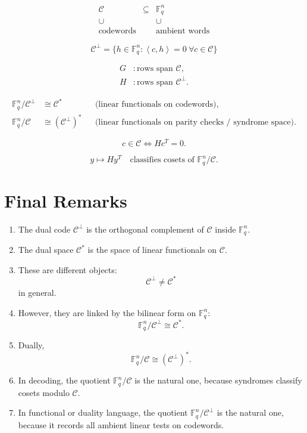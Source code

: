 \documentclass[11pt]{article}
\theoremstyle{remark}
\newcommand{\F}{\mathbb{F}}
\newcommand{\C}{\mathcal{C}}
\newcommand{\Cp}{\mathcal{C}^{\perp}}
\newcommand{\ip}[2]{\left\langle #1,#2\right\rangle}
\begin{document}
	\[
	\begin{array}{ccc}
		\C & \subseteq & \F_q^n \\
		\cup && \cup \\
		\text{codewords} && \text{ambient words}
	\end{array}
	\]
	
	\[
	\Cp
	=
	\{h\in\F_q^n:\ip{c}{h}=0 \ \forall c\in\C\}
	\]
	
	\[
	\begin{aligned}
		G &: \text{rows span } \C,\\[4pt]
		H &: \text{rows span } \Cp.
	\end{aligned}
	\]
	
	\[
	\begin{aligned}
		\F_q^n/\Cp &\cong \C^*
		&& \text{(linear functionals on codewords)},\\[4pt]
		\F_q^n/\C &\cong (\Cp)^*
		&& \text{(linear functionals on parity checks / syndrome space)}.
	\end{aligned}
	\]
	
	\[
	c\in\C \iff Hc^T=0.
	\]
	
	\[
	y\mapsto Hy^T
	\quad\text{classifies cosets of }\F_q^n/\C.
	\]
	
	\section{Final Remarks}
	
	\begin{enumerate}[leftmargin=2em]
		\item The dual code \(\Cp\) is the orthogonal complement of \(\C\) inside \(\F_q^n\).
		\item The dual space \(\C^*\) is the space of linear functionals on \(\C\).
		\item These are different objects:
		\[
		\Cp \neq \C^*
		\]
		in general.
		\item However, they are linked by the bilinear form on \(\F_q^n\):
		\[
		\F_q^n/\Cp \cong \C^*.
		\]
		\item Dually,
		\[
		\F_q^n/\C \cong (\Cp)^*.
		\]
		\item In decoding, the quotient \(\F_q^n/\C\) is the natural one, because syndromes classify cosets modulo \(\C\).
		\item In functional or duality language, the quotient \(\F_q^n/\Cp\) is the natural one, because it records all ambient linear tests on codewords.
	\end{enumerate}
\end{document}
